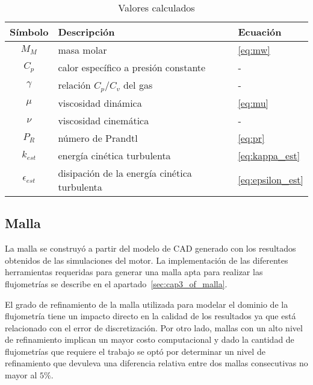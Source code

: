 \begin{table}[h]
  \centering
  \begin{tabular}{cll}\toprule
    Símbolo & Descripción & Ecuación\\ \midrule
    $M_{M}$ & masa molar & \ref{eq:mw} \\
    $C_{p}$ & calor específico a presión constante & - \\
    $\gamma$ & relación $C_{p}/C_{v}$ del gas & - \\
    $\mu$ & viscosidad dinámica & \ref{eq:mu} \\
    $\nu$ & viscosidad cinemática & - \\
    $P_{R}$ & número de Prandtl & \ref{eq:pr} \\
    $k_{est}$ & energía cinética turbulenta & \ref{eq:kappa_est} \\
    $\epsilon_{est}$ & disipación de la energía cinética turbulenta & \ref{eq:epsilon_est} \\ \bottomrule
  \end{tabular}
  \caption{Valores calculados}\label{tab:valores_calculados}
\end{table}



\subsection{Malla}

La malla se construyó a partir del modelo de CAD generado con los resultados
obtenidos de las simulaciones del motor.
%
La implementación de las diferentes herramientas requeridas para generar una
malla apta para realizar las flujometrías se describe en el
apartado~\ref{sec:cap3_of_malla}.

El grado de refinamiento de la malla utilizada para modelar el dominio de la
flujometría tiene un impacto directo en la calidad de los resultados ya que
está relacionado con el error de discretización.
%
Por otro lado, mallas con un alto nivel de refinamiento implican un mayor costo
computacional y dado la cantidad de flujometrías que requiere el trabajo se
optó por determinar un nivel de refinamiento que devuleva una diferencia
relativa entre dos mallas consecutivas no mayor al $5\%$.

